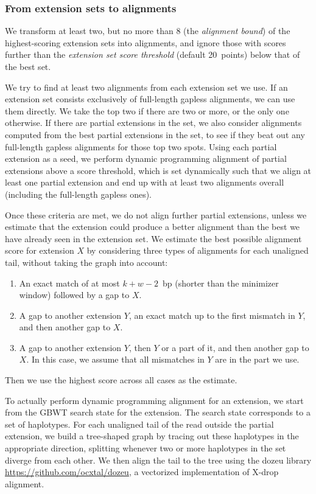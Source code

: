 \documentclass[11pt]{ucscthesis}
\newcommand{\param}[1]{\emph{#1}}
\begin{document}
\subsubsection{From extension sets to alignments}
\label{sec:extensions-to-alignments}

We transform at least two, but no more than 8 (the \param{alignment bound}) of the highest-scoring extension sets into alignments, and ignore those with scores further than the \param{extension set score threshold} (default 20~points) below that of the best set.

We try to find at least two alignments from each extension set we use.
If an extension set consists exclusively of full-length gapless alignments, we can use them directly. We take the top two if there are two or more, or the only one otherwise.
If there are partial extensions in the set, we also consider alignments computed from the best partial extensions in the set, to see if they beat out any full-length gapless alignments for those top two spots.
Using each partial extension as a seed, we perform dynamic programming alignment of partial extensions above a score threshold, which is set dynamically such that we align at least one partial extension and end up with at least two alignments overall (including the full-length gapless ones).

Once these criteria are met, we do not align further partial extensions, unless we estimate that the extension could produce a better alignment than the best we have already seen in the extension set.
We estimate the best possible alignment score for extension $X$ by considering three types of alignments for each unaligned tail, without taking the graph into account:
\begin{enumerate}
\item An exact match of at most $k + w - 2$~bp (shorter than the minimizer window) followed by a gap to $X$.
\item A gap to another extension $Y$, an exact match up to the first mismatch in $Y$, and then another gap to $X$.
\item A gap to another extension $Y$, then $Y$ or a part of it, and then another gap to $X$. In this case, we assume that all mismatches in $Y$ are in the part we use.
\end{enumerate}
Then we use the highest score across all cases as the estimate.

To actually perform dynamic programming alignment for an extension, we start from the GBWT search state for the extension.
The search state corresponds to a set of haplotypes.
For each unaligned tail of the read outside the partial extension, we build a tree-shaped graph by tracing out these haplotypes in the appropriate direction, splitting whenever two or more haplotypes in the set diverge from each other.
We then align the tail to the tree using the dozeu library \url{https://github.com/ocxtal/dozeu}, a vectorized implementation of X-drop alignment.
\end{document}
